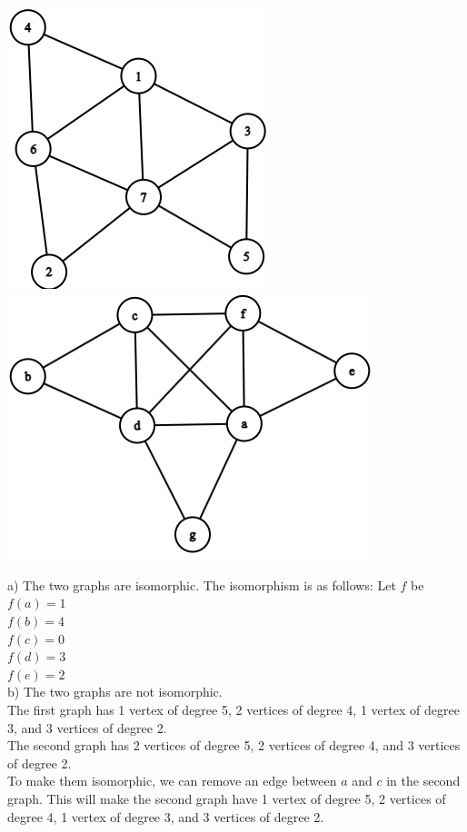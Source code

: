 \documentclass[12pt]{exam}
\begin{document}
\begin{qparts}
	\item ~\\\includegraphics[scale=.85]{Homework/Images/isomorphisim_graph_4.png} \includegraphics[scale=.85]{Homework/Images/isomorphisim_graph_3.png}
\end{qparts}

\begin{solution}
	a) The two graphs are isomorphic. The isomorphism is as follows:
	Let $f$ be\\
	$f(a) = 1$\\
	$f(b) = 4$\\
	$f(c) = 0$\\
	$f(d) = 3$\\
	$f(e) = 2$\\
	b) The two graphs are not isomorphic. \\
	The first graph has 1 vertex of degree 5, 2 vertices of degree 4, 1 vertex of degree 3, and 3 vertices of degree 2.\\
	The second graph has 2 vertices of degree 5, 2 vertices of degree 4, and 3 vertices of degree 2.\\
	To make them isomorphic, we can remove an edge between $a$ and $c$ in the second graph. This will make the second graph have 1 vertex of degree 5, 2 vertices of degree 4, 1 vertex of degree 3, and 3 vertices of degree 2.\\


\end{solution}
\end{document}
